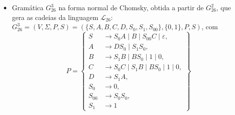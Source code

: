 \documentclass[12pt]{article}
\def\myling{{26}} %
\newcommand{\ve}{\ensuremath{\varepsilon}}
\begin{document}
\begin{tcolorbox}[breakable,rounded corners, colback=yellow!5, colframe=red!40!black, title={Forma normal de Chomsky.}]
\begin{itemize}
  \item Gramática $G_{\myling}^3$ na forma normal de Chomsky, obtida a partir de $G_{\myling}^2$, que gera as cadeias da linguagem $\mathcal{L}_{\myling}$:\\
  $G_{\myling}^3=(V,\Sigma,P,S)=(\{S,A,B,C,D,S_0,S_1,S_{00}\},\{0,1\},P,S)$, com
    \[P=\left\{
     \begin{aligned}
      S & \to S_0A \mid B \mid S_{00}C \mid \ve, \\
      A & \to DS_0 \mid S_1S_0, \\
      B & \to S_1B \mid BS_0 \mid 1 \mid 0, \\
      C & \to S_0C \mid S_1B \mid BS_0 \mid 1 \mid 0, \\
      D & \to S_1A, \\
      S_0 & \to 0,\\
      S_{00} & \to S_0S_0, \\
      S_1 & \to 1
     \end{aligned}
    \right\}\]
\end{itemize}
\end{tcolorbox}
\end{document}
